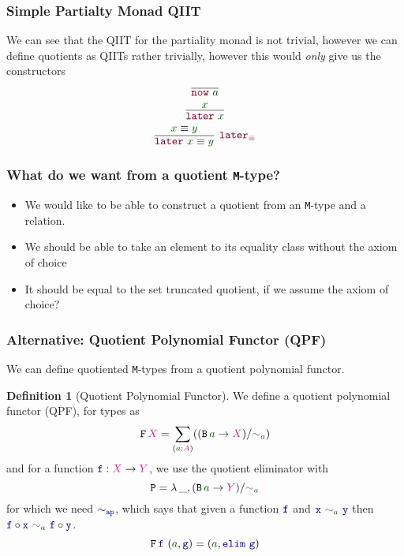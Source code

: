 \documentclass[xelatex,mathserif,serif,notheorems]{beamer} %
\theoremstyle{plain} %
\theoremstyle{definition}
\newtheorem{defn}[thm]{Definition}%
\theoremstyle{remark}
\newcommand*{\term}[1]{\textcolor{green!30!black}{#1}} %
\newcommand*{\type}[1]{\textcolor{magenta!90!black}{#1}}
\newcommand*{\relation}[1]{\textcolor{gray!75!black}{\ensuremath{\mathtt{#1}}}}
\newcommand*{\function}[1]{\textcolor{blue!60!black}{\ensuremath{\mathtt{#1}}}}
\newcommand*{\constructor}[1]{\textcolor{purple!60!black}{\ensuremath{\mathtt{#1}}}}
\newcommand*{\typeformer}[1]{\ensuremath{\mathtt{#1}}}
\newcommand*{\functor}[1]{\ensuremath{\mathbf{\mathtt{#1}}}}
\newcommand{\setlengths}{
  \setlength{\abovedisplayskip}{4pt}
  \setlength{\belowdisplayskip}{4pt}
  \setlength{\abovedisplayshortskip}{2pt}
  \setlength{\belowdisplayshortskip}{2pt}
}
\begin{document}
\begin{frame}
  \frametitle{Simple Partialty Monad QIIT}
  We can see that the QIIT for the partiality monad is not trivial, however we can define quotients as QIITs rather trivially, however this would \emph{only} give us the constructors
  \begin{equation}
    \vcenter{\infer{\constructor{now}~\term{a}}{}}
  \end{equation}
  \begin{equation}
    \vcenter{\infer{\constructor{later}~\term{x}}{\term{x}}}
  \end{equation}
  \begin{equation}
    \vcenter{\infer[\constructor{later_{\equiv}}]{\constructor{later}~\term{x} \equiv \term{y}}{\term{x} \equiv \term{y}}}
  \end{equation}
\end{frame}

\begin{frame}
  \frametitle{What do we want from a quotient \texttt{M}-type?}
  \begin{itemize}
  \item We would like to be able to construct a quotient from an \texttt{M}-type and a relation.
  \item We should be able to take an element to its equality class without the axiom of choice
  \item It should be equal to the set truncated quotient, if we assume the axiom of choice?
  \end{itemize}
\end{frame}

\begin{frame}
  \frametitle{Alternative: Quotient Polynomial Functor (QPF)}
  We can define quotiented \texttt{M}-types from a quotient polynomial functor.
  \begin{defn}[Quotient Polynomial Functor]\setlengths
    We define a quotient polynomial functor (QPF), for types as
    \begin{equation}
      \functor{F}\,\type{X} =  \sum_{(\term{a} : \type{A})} ((\typeformer{B}\,\term{a} \rightarrow \type{X}) / \relation{\sim}_{\term{a}})
    \end{equation}
    and for a function \(\function{f} : \type{X} \rightarrow \type{Y}\), we use the quotient eliminator with
    \begin{equation}
      \typeformer{P} = \lambda\,\_, (\typeformer{B}\,\term{a} \rightarrow \type{Y})/\relation{\sim}_{\term{a}}
    \end{equation}
    for which we need \(\function{\sim_{ap}}\), which says that given a function \(\function{f}\) and \(\function{x}~\relation{\sim}_{\term{a}}~\function{y}\) then \(\function{f} \circ \function{x}~\relation{\sim}_{\term{a}}~\function{f} \circ \function{y}\).
    \begin{equation}
      \functor{F}\,\function{f}~(\term{a} , \function{g}) = (\term{a} , \function{elim}~\function{g})
    \end{equation}
  \end{defn}
\end{frame}
\end{document}
